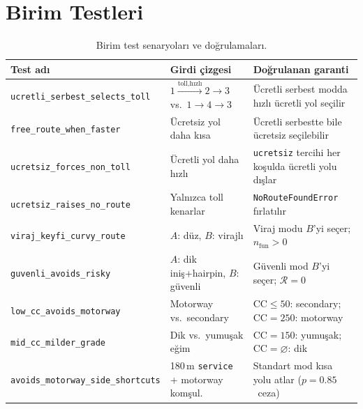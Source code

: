 \documentclass[11pt,a4paper]{article}
\newcommand{\CC}{\mathrm{CC}}
\theoremstyle{definition}
\begin{document}
\section{Birim Testleri}\label{sec:tests}

\begin{table}[H]
\centering
\caption{Birim test senaryolar{\i} ve do\u{g}rulamalar{\i}.}
\label{tab:tests}
\renewcommand{\arraystretch}{1.2}
\small
\begin{tabular}{p{5.2cm}p{4cm}p{4.8cm}}
\toprule
\textbf{Test ad{\i}} & \textbf{Girdi \c{c}izgesi} & \textbf{Do\u{g}rulanan garanti} \\
\midrule
\texttt{ucretli\_serbest\_selects\_toll} &
  $1\!\xrightarrow{\text{toll,hızlı}}\!2\!\to\!3$
  vs.\ $1\!\to\!4\!\to\!3$ &
  \"Ucretli serbest modda h{\i}zl{\i} ücretli yol se\c{c}ilir \\
\texttt{free\_route\_when\_faster} &
  \"Ucretsiz yol daha k{\i}sa &
  \"Ucretli serbestte bile \"ucretsiz se\c{c}ilebilir \\
\texttt{ucretsiz\_forces\_non\_toll} &
  \"Ucretli yol daha h{\i}zl{\i} &
  \texttt{ucretsiz} tercihi her ko\c{s}ulda ücretli yolu d{\i}\c{s}lar \\
\texttt{ucretsiz\_raises\_no\_route} &
  Yaln{\i}zca toll kenarlar &
  \texttt{NoRouteFoundError} f{\i}rlat{\i}l{\i}r \\
\midrule
\texttt{viraj\_keyfi\_curvy\_route} &
  $A$: d\"uz, $B$: virajl{\i} &
  Viraj modu $B$'yi se\c{c}er; $n_{\text{fun}}>0$ \\
\texttt{guvenli\_avoids\_risky} &
  $A$: dik ini\c{s}+hairpin, $B$: g\"uvenli &
  G\"uvenli mod $B$'yi se\c{c}er; $\mathcal{R}=0$ \\
\midrule
\texttt{low\_cc\_avoids\_motorway} &
  Motorway vs.\ secondary &
  $\CC\le 50$: secondary; $\CC=250$: motorway \\
\texttt{mid\_cc\_milder\_grade} &
  Dik vs.\ yumu\c{s}ak e\u{g}im &
  $\CC=150$: yumu\c{s}ak; $\CC=\varnothing$: dik \\
\texttt{avoids\_motorway\_side\_shortcuts} &
  180\,m \texttt{service} + motorway kom\c{s}ul. &
  Standart mod k{\i}sa yolu atlar ($p=0.85$~ceza) \\
\bottomrule
\end{tabular}
\end{table}
\end{document}
